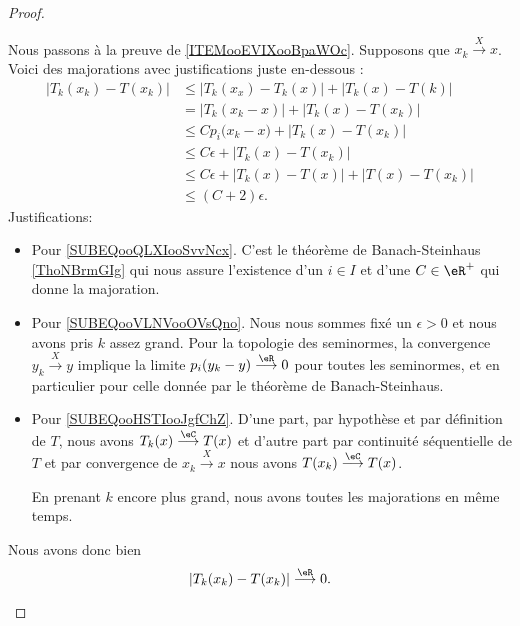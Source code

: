 \begin{proof}
\begin{subproof}
    Nous passons à la preuve de \ref{ITEMooEVIXooBpaWOc}. Supposons que \( x_k\stackrel{X}{\longrightarrow}x\). Voici des majorations avec justifications juste en-dessous :
        \begin{subequations}
            \begin{align}
                | T_k(x_k)-T(x_k) |&\leq | T_{k}(x_{x})-T_{k}(x) |+| T_{k}(x)-T(k) |\\
                &=| T_k(x_k-x) |+| T_{k}(x)-T(x_{k}) |\\
                &\leq C p_i\big( x_{k}-x \big) + | T_{k}(x)-T(x_k) |      \label{SUBEQooQLXIooSvvNcx}\\
                &\leq C \epsilon +    | T_{k}(x)-T(x_{k}) |          \label{SUBEQooVLNVooOVsQno}\\
                &\leq C \epsilon    +| T_{k}(x)-T(x) |+| T(x)-T(x_{k}) | \\
                &\leq (C+2)\epsilon.        \label{SUBEQooHSTIooJgfChZ}
            \end{align}
        \end{subequations}
        Justifications:
        \begin{itemize}
            \item Pour \eqref{SUBEQooQLXIooSvvNcx}. C'est le théorème de Banach-Steinhaus \ref{ThoNBrmGIg} qui nous assure l'existence d'un \( i\in I\) et d'une \( C\in \eR^+\) qui donne la majoration.
            \item Pour \eqref{SUBEQooVLNVooOVsQno}. Nous nous sommes fixé un \( \epsilon>0\) et nous avons pris \( k\) assez grand. Pour la topologie des seminormes, la convergence \( y_k\stackrel{X}{\longrightarrow}y\) implique la limite \( p_i(y_k-y)\stackrel{\eR}{\longrightarrow}0\) pour toutes les seminormes, et en particulier pour celle donnée par le théorème de Banach-Steinhaus.
            \item Pour \eqref{SUBEQooHSTIooJgfChZ}. D'une part, par hypothèse et par définition de \( T\), nous avons \( T_{k}(x)\stackrel{\eC}{\longrightarrow}T(x)\) et d'autre part par continuité séquentielle de \( T\) et par convergence de \( x_{k}\stackrel{X}{\longrightarrow}x\) nous avons \( T(x_{k})\stackrel{\eC}{\longrightarrow} T(x)\).

                En prenant \( k\) encore plus grand, nous avons toutes les majorations en même temps.
        \end{itemize}
        Nous avons donc bien 
        \begin{equation}
            | T_{k}(x_{k})-T(x_{k}) |\stackrel{\eR}{\longrightarrow}0.
        \end{equation}


\end{subproof}
\end{proof}
